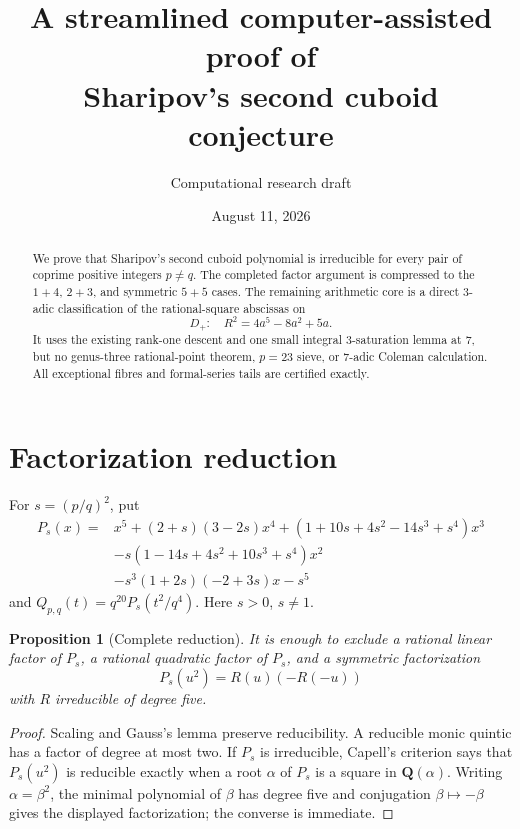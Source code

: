 \documentclass[11pt]{article}
\title{A streamlined computer-assisted proof of\\
Sharipov's second cuboid conjecture}
\author{Computational research draft}
\date{August 11, 2026}
\newtheorem{proposition}[theorem]{Proposition}
\newcommand{\Q}{\mathbf Q}
\begin{document}
\maketitle

\begin{abstract}
We prove that Sharipov's second cuboid polynomial is irreducible for every
pair of coprime positive integers \(p\ne q\).  The completed factor argument
is compressed to the \(1+4\), \(2+3\), and symmetric \(5+5\) cases.  The
remaining arithmetic core is a direct \(3\)-adic classification of the
rational-square abscissas on
\[
 D_+:\quad R^2=4a^5-8a^2+5a.
\]
It uses the existing rank-one descent and one small integral
\(3\)-saturation lemma at \(7\), but no genus-three rational-point theorem,
\(p=23\) sieve, or \(7\)-adic Coleman calculation.  All exceptional fibres
and formal-series tails are certified exactly.
\end{abstract}

\section{Factorization reduction}

For \(s=(p/q)^2\), put
\[
\begin{aligned}
P_s(x)={}&x^5+(2+s)(3-2s)x^4
 +(1+10s+4s^2-14s^3+s^4)x^3\\
&-s(1-14s+4s^2+10s^3+s^4)x^2\\
&-s^3(1+2s)(-2+3s)x-s^5
\end{aligned}
\]
and \(Q_{p,q}(t)=q^{20}P_s(t^2/q^4)\).  Here \(s>0\), \(s\ne1\).

\begin{proposition}[Complete reduction]\label{prop:factor}
It is enough to exclude a rational linear factor of \(P_s\), a rational
quadratic factor of \(P_s\), and a symmetric factorization
\[
 P_s(u^2)=R(u)(-R(-u))
\]
with \(R\) irreducible of degree five.
\end{proposition}

\begin{proof}
Scaling and Gauss's lemma preserve reducibility.  A reducible monic quintic
has a factor of degree at most two.  If \(P_s\) is irreducible, Capell's
criterion says that \(P_s(u^2)\) is reducible exactly when a root \(\alpha\)
of \(P_s\) is a square in \(\Q(\alpha)\).  Writing \(\alpha=\beta^2\), the
minimal polynomial of \(\beta\) has degree five and conjugation
\(\beta\mapsto-\beta\) gives the displayed factorization; the converse is
immediate.
\end{proof}
\end{document}
